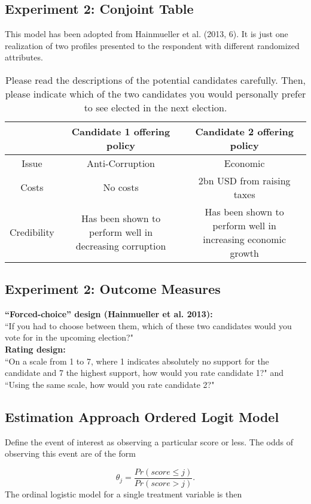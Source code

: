 \documentclass[11pt]{article}
\begin{document}
\subsection{Experiment 2: Conjoint Table}
This model has been adopted from Hainmueller et al. (2013, 6). It is just one realization of two profiles presented to the respondent with different randomized attributes.
\begin{table}[!ht]
	\caption{Please read the descriptions of the potential candidates carefully. Then, please indicate which of the two candidates you would personally prefer to see elected in the next election.} \label{tab:tab2}
\begin{tabular}{ccc}
	\toprule
	& Candidate 1 offering policy & Candidate 2 offering policy \\
	\midrule
	Issue & Anti-Corruption & Economic \\
	Costs & No costs & 2bn USD from raising taxes \\
	Credibility & \makecell{Has been shown to perform well in \\ decreasing corruption} & \makecell{Has been shown to perform well in \\ increasing economic growth} \\
	\bottomrule
	\end{tabular}
\end{table}

\subsection{Experiment 2: Outcome Measures}
\textbf{``Forced-choice'' design (Hainmueller et al. 2013):}\\
“If you had to choose between them, which of these two candidates would you vote for in the upcoming election?"\\
\textbf{Rating design:}\\
``On a scale from 1 to 7, where 1 indicates absolutely no support for the candidate and 7 the highest support, how would you rate candidate 1?" and “Using the same scale, how would you rate candidate 2?"

\subsection{Estimation Approach Ordered Logit Model}
Define the event of interest as observing a particular score or less. The odds of observing this event are of the form

\begin{equation*}
\theta_j = \frac{Pr(score \leq j)}{Pr(score > j)}.
\end{equation*}
The ordinal logistic model for a single treatment variable is then
\end{document}

